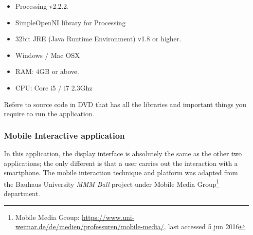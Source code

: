 \begin{itemize}
\item Processing v2.2.2.
\item SimpleOpenNI library for Processing \cite{simpleopenni}
\item 32bit JRE (Java Runtime Environment) v1.8 or higher.
\item Windows / Mac OSX
\item RAM: 4GB or above.
\item CPU: Core i5 / i7 2.3Ghz
\end{itemize}

Refere to source code in DVD that has all the libraries and important things you require to run the application.

\fi

\subsubsection{Mobile Interactive application}
In this application, the display interface is absolutely the same as the other two applications; the only different is that a user carries out the interaction with a smartphone. The mobile interaction technique and platform was adapted from the Bauhaus University \emph{MMM Ball}\cite{MMMball, MMMball2} project under Mobile Media Group\footnote{Mobile Media Group: \url{https://www.uni-weimar.de/de/medien/professuren/mobile-media/}, last accessed 5 jun 2016} department.

